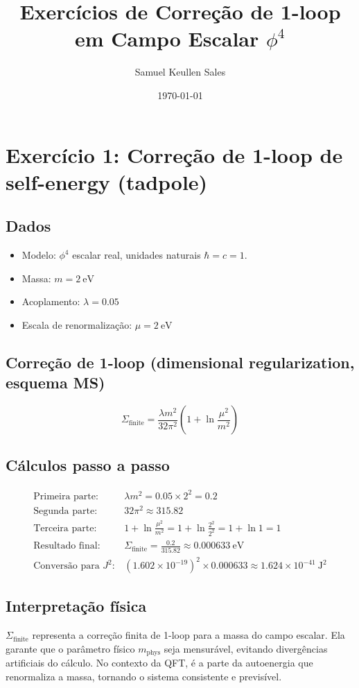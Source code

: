 \documentclass[12pt,a4paper]{article}
\title{Exercícios de Correção de 1-loop em Campo Escalar $\phi^4$}
\author{Samuel Keullen Sales}
\date{\today}
\begin{document}
\maketitle

\section*{Exercício 1: Correção de 1-loop de self-energy (tadpole)}

\subsection*{Dados}
\begin{itemize}
    \item Modelo: $\phi^4$ escalar real, unidades naturais $\hbar = c = 1$.
    \item Massa: $m = \SI{2}{\electronvolt}$
    \item Acoplamento: $\lambda = 0.05$
    \item Escala de renormalização: $\mu = \SI{2}{\electronvolt}$
\end{itemize}

\subsection*{Correção de 1-loop (dimensional regularization, esquema MS)}
\[
\Sigma_\text{finite} = \frac{\lambda m^2}{32\pi^2} \left(1 + \ln \frac{\mu^2}{m^2} \right)
\]

\subsection*{Cálculos passo a passo}
\begin{align*}
\text{Primeira parte: } & \lambda m^2 = 0.05 \times 2^2 = 0.2 \\
\text{Segunda parte: } & 32\pi^2 \approx 315.82 \\
\text{Terceira parte: } & 1 + \ln \frac{\mu^2}{m^2} = 1 + \ln \frac{2^2}{2^2} = 1 + \ln 1 = 1 \\
\text{Resultado final: } & \Sigma_\text{finite} = \frac{0.2}{315.82} \approx 0.000633~\text{eV} \\
\text{Conversão para } J^2: & (1.602\times 10^{-19})^2 \times 0.000633 \approx 1.624\times 10^{-41}~\text{J}^2
\end{align*}

\subsection*{Interpretação física}
$\Sigma_\text{finite}$ representa a correção finita de 1-loop para a massa do campo escalar. Ela garante que o parâmetro físico $m_\text{phys}$ seja mensurável, evitando divergências artificiais do cálculo. No contexto da QFT, é a parte da autoenergia que renormaliza a massa, tornando o sistema consistente e previsível.
\end{document}
